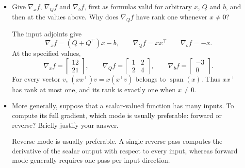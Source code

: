 \documentclass{article}
\theoremstyle{definition}
\theoremstyle{remark}
\begin{document}
\begin{itemize}
    \item Give $\nabla_x f$, $\nabla_Q f$ and $\nabla_b f$, first as formulas valid for
    arbitrary $x$, $Q$ and $b$, and then at the values above. Why does
    $\nabla_Q f$ have rank one whenever $x\ne0$?\begin{solution}
        The input adjoints give
        \[
            \nabla_x f=(Q+Q^\top)x - b,
            \qquad
            \nabla_Q f=xx^\top
            \qquad
            \nabla_b f=-x.
        \]
        At the specified values,
        \[
            \nabla_x f=\begin{bmatrix}12\\21\end{bmatrix},
            \qquad
            \nabla_Q f=\begin{bmatrix}1&2\\2&4\end{bmatrix}, 
            \qquad
            \nabla_b f=\begin{bmatrix}-3\\0\end{bmatrix}.
        \]
        For every vector $v$, $(xx^\top)v=x(x^\top v)$ belongs to
        $\operatorname{span}(x)$. Thus $xx^\top$ has rank at most one, and
        its rank is exactly one when $x\ne0$.
    \end{solution}

    \item More generally, suppose that a scalar-valued function has many
    inputs. To compute its full gradient, which mode is usually preferable:
    forward or reverse? Briefly justify your answer.
    \begin{solution}
        Reverse mode is usually preferable. A single reverse pass computes
        the derivative of the scalar output with respect to every input,
        whereas forward mode generally requires one pass per input direction.
    \end{solution}
\end{itemize}
\end{document}
